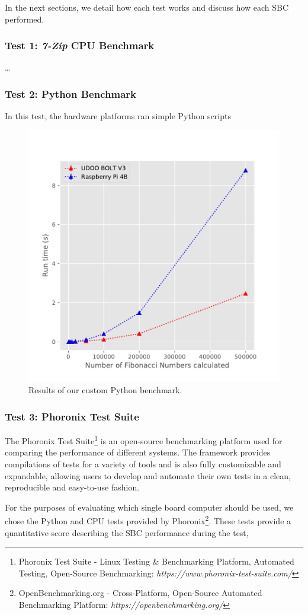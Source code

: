 In the next sections, we detail how each test works and discuss how each \acs{SBC} performed. 

\subsubsection{Test 1: \textit{7-Zip} CPU Benchmark}
\dots

\subsubsection{Test 2: Python Benchmark}
In this test, the hardware platforms ran simple Python scripts 

\begin{figure}[H]
    \centering
    \includegraphics[width=0.6 \linewidth]{images/fibonacci-test.pdf}
    \caption{Results of our custom Python benchmark. }
    \label{fig:fibonacci-tests}
\end{figure}

\subsubsection{Test 3: Phoronix Test Suite}
The Phoronix Test Suite\footnote{Phoronix Test Suite - Linux Testing \& Benchmarking Platform, Automated Testing, Open-Source Benchmarking: \textit{https://www.phoronix-test-suite.com/}} is an open-source benchmarking platform used for comparing the performance of different systems. The framework provides compilations of tests for a variety of tools and is also fully customizable and expandable, allowing users to develop and automate their own tests in a clean, reproducible and easy-to-use fashion.  

For the purposes of evaluating which single board computer should be used, we chose the Python and CPU tests provided by Phoronix\footnote{OpenBenchmarking.org - Cross-Platform, Open-Source Automated Benchmarking Platform: \textit{https://openbenchmarking.org/}}. These tests provide a quantitative score describing the \acs{SBC} performance during the test, 


